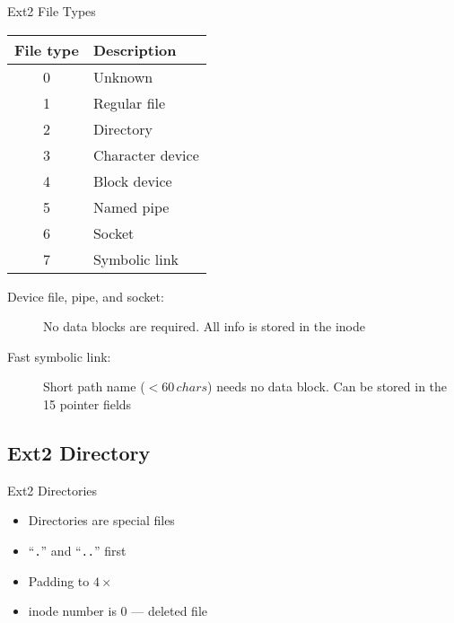 \begin{frame}{Ext2 File Types}
  \begin{center}
    \begin{tabular}{c|l}
      File type&Description\\\hline
      0&Unknown\\
      1&Regular file\\
      2&Directory\\
      3&Character device\\
      4&Block device\\
      5&Named pipe\\
      6&Socket\\
      7&Symbolic link
    \end{tabular}
  \end{center}
  \begin{description}
  \item[Device file, pipe, and socket:] No data blocks are required. All info is stored in
    the inode
  \item[Fast symbolic link:] Short path name ($< 60\,chars$) needs no data block. Can be
    stored in the 15 pointer fields
  \end{description}
\end{frame}

\subsection{Ext2 Directory}
\label{sec:ext2-directory}

\begin{frame}{Ext2 Directories}
  \begin{center}
  \end{center}
  \begin{varwidth}{.39\textwidth}
    \begin{center}
    \end{center}
  \end{varwidth}\hfill
  \begin{varwidth}{.55\textwidth}
    \begin{itemize}
    \item Directories are special files
    \item ``\texttt{.}'' and ``\texttt{..}'' first
    \item Padding to $4\times{}$
    \item inode number is 0 --- deleted file
    \end{itemize}
  \end{varwidth}
\end{frame}

